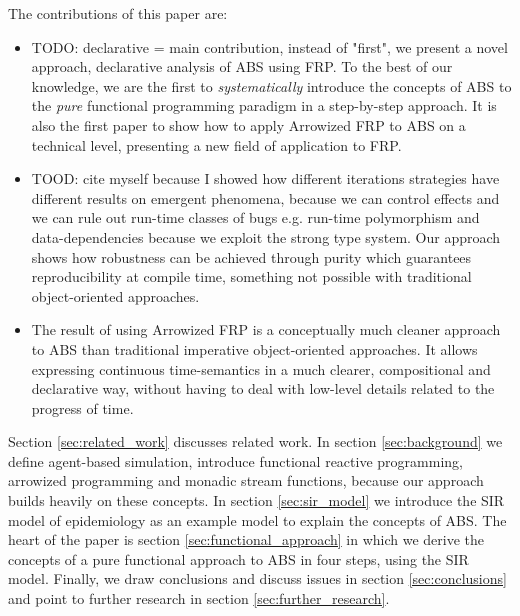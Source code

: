 The contributions of this paper are:
\begin{itemize}
	\item TODO: declarative = main contribution, instead of "first", we present a novel approach, declarative analysis of ABS using FRP. To the best of our knowledge, we are the first to \textit{systematically} introduce the concepts of ABS to the \textit{pure} functional programming paradigm in a step-by-step approach. It is also the first paper to show how to apply Arrowized FRP to ABS on a technical level, presenting a new field of application to FRP.
	\item TOOD: cite myself because I showed how different iterations strategies have different results on emergent phenomena,  because we can control effects and we can rule out run-time classes of bugs e.g. run-time polymorphism and data-dependencies because we exploit the strong type system. Our approach shows how robustness can be achieved through purity which guarantees reproducibility at compile time, something not possible with traditional object-oriented approaches.
	\item The result of using Arrowized FRP is a conceptually much cleaner approach to ABS than traditional imperative object-oriented approaches. It allows expressing continuous time-semantics in a much clearer, compositional and declarative way, without having to deal with low-level details related to the progress of time.
\end{itemize}

Section \ref{sec:related_work} discusses related work. In section \ref{sec:background} we define agent-based simulation, introduce functional reactive programming, arrowized programming and monadic stream functions, because our approach builds heavily on these concepts. In section \ref{sec:sir_model} we introduce the SIR model of epidemiology as an example model to explain the concepts of ABS. The heart of the paper is section \ref{sec:functional_approach} in which we derive the concepts of a pure functional approach to ABS in four steps, using the SIR model. Finally, we draw conclusions and discuss issues in section \ref{sec:conclusions} and point to further research in section \ref{sec:further_research}.

